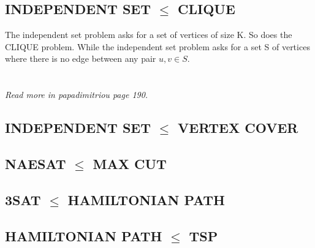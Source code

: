 \documentclass{article}
\begin{document}
\subsection{INDEPENDENT SET $\le$ CLIQUE}
The independent set problem asks for a set of vertices of size K. So does the CLIQUE problem. While the independent set problem asks for a set S of vertices where there is no edge between any pair $u,v \in S$.
\\\\\\
\textit{Read more in papadimitriou page 190.}
\subsection{INDEPENDENT SET $\le$ VERTEX COVER}
\subsection{NAESAT $\le$ MAX CUT}
\subsection{3SAT $\le$ HAMILTONIAN PATH}
\subsection{HAMILTONIAN PATH $\le$ TSP}
\end{document}
